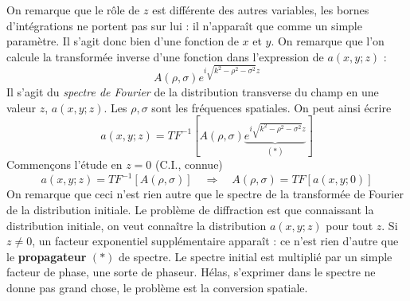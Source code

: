 On remarque que le rôle de $z$ est différente des autres variables, les bornes d'intégrations 
ne portent pas sur lui : il n'apparaît que comme un simple paramètre. Il s'agit donc bien d'une 
fonction de $x$ et $y$. On remarque que l'on calcule la transformée inverse d'une fonction dans 
l'expression de $a(x,y;z)$ :
\begin{equation}
A(\rho,\sigma)e^{i\sqrt{k^2-\rho^2-\sigma^2}z}
\end{equation}
Il s'agit du \textit{spectre de Fourier} de la distribution transverse du champ en une valeur $z$, 
$a(x,y;z)$. Les $\rho,\sigma$ sont les fréquences spatiales. On peut ainsi écrire
\begin{equation}
a(x,y;z) = TF^{-1}\left[ A(\rho,\sigma)\underbrace{e^{i\sqrt{k^2-\rho^2-\sigma^2}z} }_{(*)}\right]
\end{equation}
Commençons l'étude en $z=0$ (C.I., connue)
\begin{equation}
a(x,y;z) = TF^{-1}\left[ A(\rho,\sigma) \right]\quad \Rightarrow \quad A(\rho,\sigma) = TF[
a(x,y;0)]
\end{equation}
On remarque que ceci n'est rien autre que le spectre de la transformée de Fourier de la distribution 
initiale. Le problème de diffraction est que connaissant la distribution initiale, on veut connaître 
la distribution $a(x,y;z)$ pour tout $z$. Si $z\neq0$, un facteur exponentiel supplémentaire apparaît 
: ce n'est rien d'autre que le \textbf{propagateur} $(*)$ de spectre. Le spectre initial est multiplié 
par un simple facteur de phase, une sorte de phaseur. Hélas, s'exprimer dans le spectre ne donne pas 
grand chose, le problème est la conversion spatiale.\\


